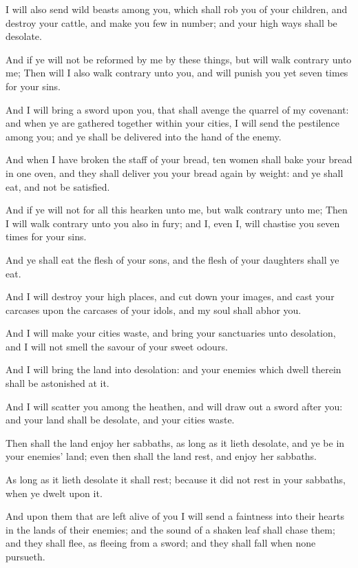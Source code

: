 \verse I will also send wild beasts among you, which shall rob you of your children, and destroy your cattle, and make you few in number; and your high ways shall be desolate.

\verse And if ye will not be reformed by me by these things, but will walk contrary unto me; \verse Then will I also walk contrary unto you, and will punish you yet seven times for your sins.

\verse And I will bring a sword upon you, that shall avenge the quarrel of my covenant: and when ye are gathered together within your cities, I will send the pestilence among you; and ye shall be delivered into the hand of the enemy.

\verse And when I have broken the staff of your bread, ten women shall bake your bread in one oven, and they shall deliver you your bread again by weight: and ye shall eat, and not be satisfied.

\verse And if ye will not for all this hearken unto me, but walk contrary unto me; \verse Then I will walk contrary unto you also in fury; and I, even I, will chastise you seven times for your sins.

\verse And ye shall eat the flesh of your sons, and the flesh of your daughters shall ye eat.

\verse And I will destroy your high places, and cut down your images, and cast your carcases upon the carcases of your idols, and my soul shall abhor you.

\verse And I will make your cities waste, and bring your sanctuaries unto desolation, and I will not smell the savour of your sweet odours.

\verse And I will bring the land into desolation: and your enemies which dwell therein shall be astonished at it.

\verse And I will scatter you among the heathen, and will draw out a sword after you: and your land shall be desolate, and your cities waste.

\verse Then shall the land enjoy her sabbaths, as long as it lieth desolate, and ye be in your enemies' land; even then shall the land rest, and enjoy her sabbaths.

\verse As long as it lieth desolate it shall rest; because it did not rest in your sabbaths, when ye dwelt upon it.

\verse And upon them that are left alive of you I will send a faintness into their hearts in the lands of their enemies; and the sound of a shaken leaf shall chase them; and they shall flee, as fleeing from a sword; and they shall fall when none pursueth.

